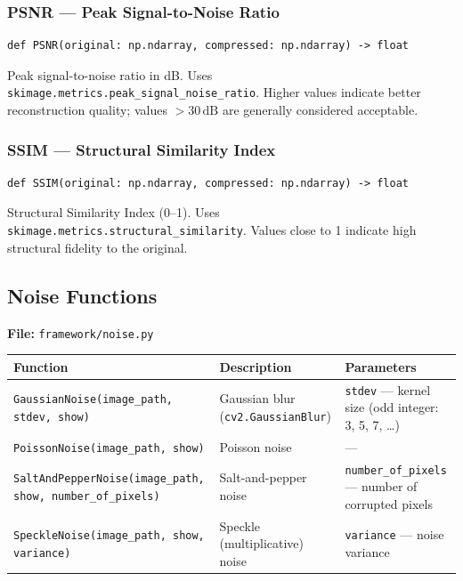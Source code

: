 \documentclass[12pt,a4paper]{article}
\newcommand{\cs}[1]{\texttt{#1}}          %
\begin{document}
\subsubsection{PSNR --- Peak Signal-to-Noise Ratio}

\begin{lstlisting}[style=python]
def PSNR(original: np.ndarray, compressed: np.ndarray) -> float
\end{lstlisting}

Peak signal-to-noise ratio in dB.  Uses
\cs{skimage.metrics.peak\_signal\_noise\_ratio}.  Higher values indicate better
reconstruction quality; values $> 30\,\mathrm{dB}$ are generally considered
acceptable.

\subsubsection{SSIM --- Structural Similarity Index}

\begin{lstlisting}[style=python]
def SSIM(original: np.ndarray, compressed: np.ndarray) -> float
\end{lstlisting}

Structural Similarity Index (0--1).  Uses
\cs{skimage.metrics.structural\_similarity}.  Values close to 1 indicate high
structural fidelity to the original.

\subsection{Noise Functions}

\textbf{File:} \cs{framework/noise.py}

\begin{center}
\begin{tabular}{p{6cm}p{4cm}p{4.5cm}}
  \toprule
  Function & Description & Parameters \\
  \midrule
  \cs{GaussianNoise(image\_path, stdev, show)}
    & Gaussian blur (\cs{cv2.GaussianBlur})
    & \cs{stdev} --- kernel size (odd integer: 3, 5, 7, \ldots) \\[4pt]
  \cs{PoissonNoise(image\_path, show)}
    & Poisson noise
    & --- \\[4pt]
  \cs{SaltAndPepperNoise(image\_path, show, number\_of\_pixels)}
    & Salt-and-pepper noise
    & \cs{number\_of\_pixels} --- number of corrupted pixels \\[4pt]
  \cs{SpeckleNoise(image\_path, show, variance)}
    & Speckle (multiplicative) noise
    & \cs{variance} --- noise variance \\
  \bottomrule
\end{tabular}
\end{center}
\end{document}
